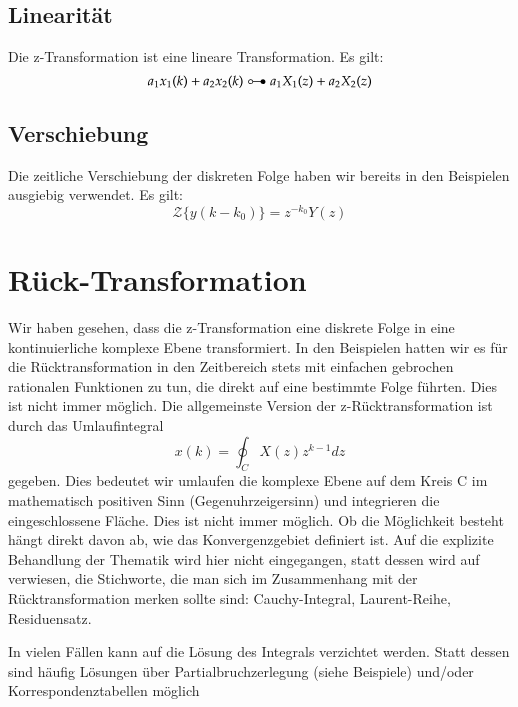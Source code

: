 \subsection{Linearität}
Die z-Transformation ist eine lineare Transformation. Es gilt:
\begin{equation}\label{eq:zTrafo:Linearitaet}
  a_1 x_1(k) + a_2 x_2(k) \HinTrans a_1 X_1(z) + a_2 X_2(z)
\end{equation}

\subsection{Verschiebung}
Die zeitliche Verschiebung der diskreten Folge haben wir bereits
in den Beispielen ausgiebig verwendet. Es gilt:
\begin{equation}\label{eq:zTrafo:Verschiebungssatz}
    \mathcal{Z}\{y(k-k_0)\} = z^{-k_0} Y(z)
\end{equation}

\section{Rück-Transformation}
Wir haben gesehen, dass die z-Transformation eine diskrete Folge
in eine kontinuierliche komplexe Ebene transformiert. In den
Beispielen hatten wir es für die Rücktransformation in den
Zeitbereich stets mit einfachen gebrochen rationalen Funktionen zu
tun, die direkt auf eine bestimmte Folge führten. Dies ist nicht
immer möglich. Die allgemeinste Version der z-Rücktransformation
ist durch das Umlaufintegral
\begin{equation}\label{eq:zRuek:Def}
    x(k) = \oint_C X(z) z^{k-1} dz
\end{equation}
gegeben. Dies bedeutet wir umlaufen die komplexe Ebene auf dem
Kreis C im mathematisch positiven Sinn (Gegenuhrzeigersinn) und
integrieren die eingeschlossene Fläche. Dies ist nicht immer
möglich. Ob die Möglichkeit besteht hängt direkt davon ab, wie das
Konvergenzgebiet definiert ist. Auf die  explizite Behandlung der
Thematik wird hier nicht eingegangen, statt dessen wird auf \cite{OS99}
verwiesen, die Stichworte, die man sich im
Zusammenhang mit der Rücktransformation merken sollte sind:
Cauchy-Integral, Laurent-Reihe, Residuensatz.

In vielen Fällen kann auf die Lösung des Integrals verzichtet
werden. Statt dessen sind häufig Lösungen über
Partialbruchzerlegung (siehe Beispiele) und/oder
Korrespondenztabellen möglich



